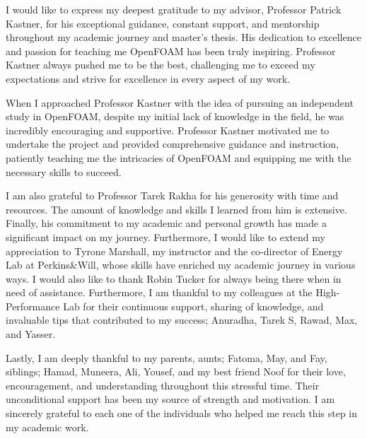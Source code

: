 
\begin{acknowledgments}

I would like to express my deepest gratitude to my advisor, Professor Patrick Kastner, for his exceptional guidance, constant support, and mentorship throughout my academic journey and master's thesis. His dedication to excellence and passion for teaching me OpenFOAM has been truly inspiring. Professor Kastner always pushed me to be the best, challenging me to exceed my expectations and strive for excellence in every aspect of my work. 

When I approached Professor Kastner with the idea of pursuing an independent study in OpenFOAM, despite my initial lack of knowledge in the field, he was incredibly encouraging and supportive. Professor Kastner motivated me to undertake the project and provided comprehensive guidance and instruction, patiently teaching me the intricacies of OpenFOAM and equipping me with the necessary skills to succeed.

I am also grateful to Professor Tarek Rakha for his generosity with time and resources. The amount of knowledge and skills I learned from him is extensive. Finally, his commitment to my academic and personal growth has made a significant impact on my journey. Furthermore, I would like to extend my appreciation to Tyrone Marshall, my instructor and the co-director of Energy Lab at Perkins\&Will, whose skills have enriched my academic journey in various ways. I would also like to thank Robin Tucker for always being there when in need of assistance. Furthermore, I am thankful to my colleagues at the High-Performance Lab for their continuous support, sharing of knowledge, and invaluable tips that contributed to my success; Anuradha, Tarek S, Rawad, Max, and Yasser.

Lastly, I am deeply thankful to my parents, aunts; Fatoma, May, and Fay, siblings; Hamad, Muneera, Ali, Yousef, and my best friend Noof for their love, encouragement, and understanding throughout this stressful time. Their unconditional support has been my source of strength and motivation.
I am sincerely grateful to each one of the individuals who helped me reach this step in my academic work.



\end{acknowledgments}
